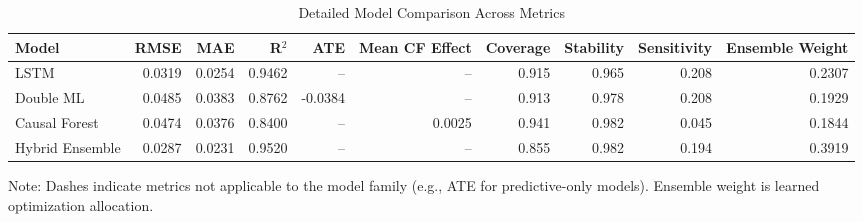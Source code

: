 \begin{table}[htbp]
  \centering
  \caption{Detailed Model Comparison Across Metrics}
  \label{tab:table5_detailed_model_comparison}
  \small
  \begin{tabular}{lrrrrrrrrr}
    \toprule
    Model & RMSE & MAE & R$^2$ & ATE & Mean CF Effect & Coverage & Stability & Sensitivity & Ensemble Weight \\
    \midrule
    LSTM & 0.0319 & 0.0254 & 0.9462 & -- & -- & 0.915 & 0.965 & 0.208 & 0.2307 \\
    Double ML & 0.0485 & 0.0383 & 0.8762 & -0.0384 & -- & 0.913 & 0.978 & 0.208 & 0.1929 \\
    Causal Forest & 0.0474 & 0.0376 & 0.8400 & -- & 0.0025 & 0.941 & 0.982 & 0.045 & 0.1844 \\
    Hybrid Ensemble & 0.0287 & 0.0231 & 0.9520 & -- & -- & 0.855 & 0.982 & 0.194 & 0.3919 \\
    \bottomrule
  \end{tabular}
  \vspace{0.5em}
  {\footnotesize Note: Dashes indicate metrics not applicable to the model family (e.g., ATE for predictive-only models). Ensemble weight is learned optimization allocation.}
\end{table}
